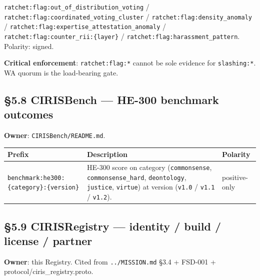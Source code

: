 \documentclass[10pt]{article}
\begin{document}
\texttt{ratchet:flag:out\_of\_distribution\_voting} / \texttt{ratchet:flag:coordinated\_voting\_cluster} / \texttt{ratchet:flag:density\_anomaly} / \texttt{ratchet:flag:expertise\_attestation\_anomaly} / \texttt{ratchet:flag:counter\_rii:\{layer\}} / \texttt{ratchet:flag:harassment\_pattern}. Polarity: signed.


\textbf{Critical enforcement}: \texttt{ratchet:flag:*} cannot be sole evidence for \texttt{slashing:*}. WA quorum is the load-bearing gate.


\subsection*{§5.8 CIRISBench — HE-300 benchmark outcomes}


\textbf{Owner}: \texttt{CIRISBench/README.md}.


{\footnotesize
\begin{longtable}{|p{5.33cm}|p{5.33cm}|p{5.33cm}|}\hline
\textbf{Prefix} & \textbf{Description} & \textbf{Polarity} \\ \hline\endhead
\texttt{benchmark:he300:\{category\}:\{version\}} & HE-300 score on category (\texttt{commonsense}, \texttt{commonsense\_hard}, \texttt{deontology}, \texttt{justice}, \texttt{virtue}) at version (\texttt{v1.0} / \texttt{v1.1} / \texttt{v1.2}). & positive-only \\ \hline
\end{longtable}}


\subsection*{§5.9 CIRISRegistry — identity / build / license / partner}


\textbf{Owner}: this Registry. Cited from \texttt{../MISSION.md} §3.4 + FSD-001 + protocol/ciris\_registry.proto.
\end{document}
